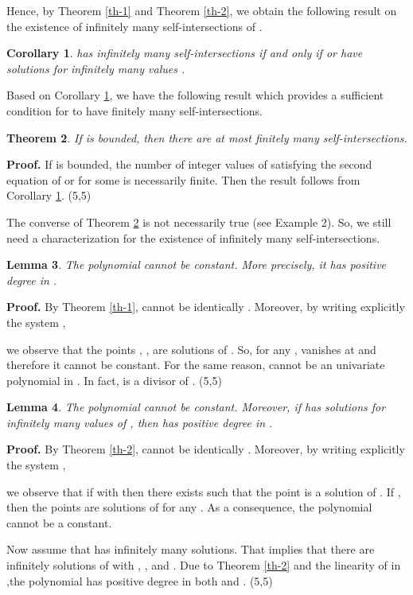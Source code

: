 \documentclass{elsart}
\def\qed{\hfill  \framebox(5,5){}}
\newtheorem{theorem}{{\bf Theorem}}
\newtheorem{corollary}[theorem]{{\bf Corollary}}
\newtheorem{lemma}[theorem]{{\bf Lemma}}
\begin{document}
Hence, by Theorem \ref{th-1} and Theorem \ref{th-2}, we obtain the following result on the existence of infinitely many
self-intersections of .
\begin{corollary} \label{corol-3}
 has infinitely many self-intersections if and only if  or  have solutions for infinitely many values .
\end{corollary}

Based on Corollary \ref{corol-3}, we have the following result which provides a sufficient condition for  to have finitely many
self-intersections.

\begin{theorem} \label{th-3}
If  is bounded, then there are at most finitely many self-intersections.
\end{theorem}

{\bf Proof.}  If  is bounded, the number of integer values of  satisfying the second equation of  or  for some  is necessarily finite. Then the result follows from Corollary \ref{corol-3}.  \qed

The converse of Theorem \ref{th-3} is not necessarily true (see Example 2). So, we still need a characterization for the existence of infinitely
many self-intersections.
\begin{lemma} \label{need}
The polynomial  cannot be constant. More precisely, it has positive degree in .\end{lemma}


{\bf Proof.}  By Theorem \ref{th-1},  cannot be identically . Moreover, by writing explicitly the system ,

we observe that the points , , are solutions of . So, for any ,  vanishes at  and therefore it cannot be constant. For the same reason,   cannot be an univariate polynomial in . In fact,  is a divisor of  . \qed


\begin{lemma} \label{need2}
The polynomial  cannot be constant. Moreover,  if  has solutions for infinitely many values of , then  has positive degree in .
\end{lemma}

{\bf Proof.} By Theorem \ref{th-2},  cannot be identically . Moreover, by writing explicitly the system ,

we observe that if  with  then there exists  such that the point  is a solution of . If , then the points  are solutions of  for any . As a consequence,   the polynomial  cannot be a constant.

Now assume that  has infinitely many solutions. That implies that there are infinitely   solutions of  with , ,  and   . Due to Theorem \ref{th-2} and the linearity of  in ,the polynomial   has positive degree in both  and .
\qed
\end{document}
